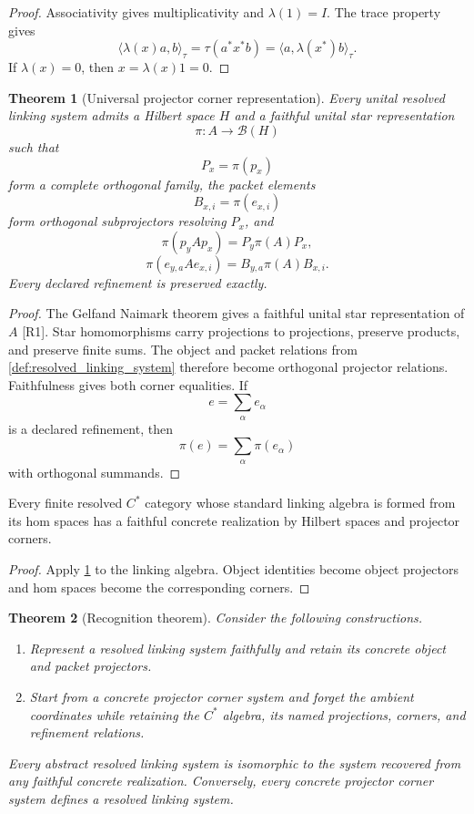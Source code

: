 \documentclass{aomart}
\newtheorem{theorem}{Theorem}[section]
\theoremstyle{definition}
\theoremstyle{remark}
\newcommand{\B}{\mathcal B}
\newcommand{\Rcite}[1]{\textup{[#1]}}
\begin{document}
\begin{proof}
Associativity gives multiplicativity and \(\lambda(1)=I\). The trace property gives
\[
 \langle\lambda(x)a,b\rangle_\tau
 =
 \tau(a^*x^*b)
 =
 \langle a,\lambda(x^*)b\rangle_\tau.
\]
If \(\lambda(x)=0\), then \(x=\lambda(x)1=0\).
\end{proof}

\begin{theorem}[Universal projector corner representation]\label{thm:universal_projector_representation}
Every unital resolved linking system admits a Hilbert space \(H\) and a faithful unital star representation
\[
 \pi:A\longrightarrow\B(H)
\]
such that
\[
 P_x=\pi(p_x)
\]
form a complete orthogonal family, the packet elements
\[
 B_{x,i}=\pi(e_{x,i})
\]
form orthogonal subprojectors resolving \(P_x\), and
\[
 \pi(p_yAp_x)=P_y\pi(A)P_x,
\]
\[
 \pi(e_{y,a}Ae_{x,i})
 =
 B_{y,a}\pi(A)B_{x,i}.
\]
Every declared refinement is preserved exactly.
\end{theorem}

\begin{proof}
The Gelfand Naimark theorem gives a faithful unital star representation of \(A\) \Rcite{R1}. Star homomorphisms carry projections to projections, preserve products, and preserve finite sums. The object and packet relations from \cref{def:resolved_linking_system} therefore become orthogonal projector relations. Faithfulness gives both corner equalities. If
\[
 e=\sum_\alpha e_\alpha
\]
is a declared refinement, then
\[
 \pi(e)=\sum_\alpha\pi(e_\alpha)
\]
with orthogonal summands.
\end{proof}

\begin{corollary}\label{cor:resolved_categories}
Every finite resolved \(C^*\) category whose standard linking algebra is formed from its hom spaces has a faithful concrete realization by Hilbert spaces and projector corners.
\end{corollary}

\begin{proof}
Apply \cref{thm:universal_projector_representation} to the linking algebra. Object identities become object projectors and hom spaces become the corresponding corners.
\end{proof}

\begin{theorem}[Recognition theorem]\label{thm:recognition}
Consider the following constructions.
\begin{enumerate}
\item Represent a resolved linking system faithfully and retain its concrete object and packet projectors.
\item Start from a concrete projector corner system and forget the ambient coordinates while retaining the \(C^*\) algebra, its named projections, corners, and refinement relations.
\end{enumerate}
Every abstract resolved linking system is isomorphic to the system recovered from any faithful concrete realization. Conversely, every concrete projector corner system defines a resolved linking system.
\end{theorem}
\end{document}
